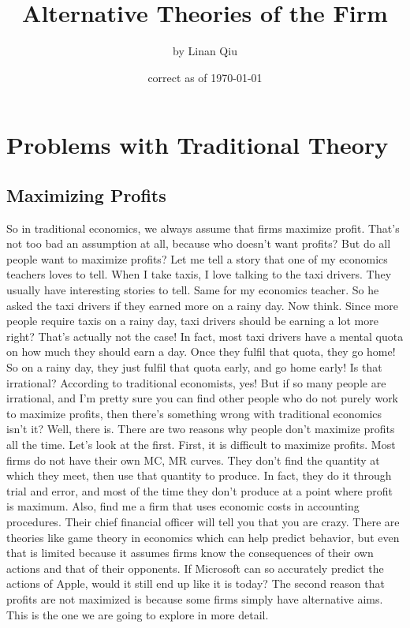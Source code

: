 \RequirePackage{../../dominatrix}

\title{Alternative Theories of the Firm}
\author{\large by Linan Qiu}
\date{\small correct as of \today}

\maketitle
\tableofcontents
\section{Problems with Traditional Theory}
\subsection{Maximizing Profits}
So in traditional economics, we always assume that firms maximize profit. That's not too bad an assumption at all, because who doesn't want profits? But do all people want to maximize profits? Let me tell a story that one of my economics teachers loves to tell. When I take taxis, I love talking to the taxi drivers. They usually have interesting stories to tell. Same for my economics teacher. So he asked the taxi drivers if they earned more on a rainy day. Now think. Since more people require taxis on a rainy day, taxi drivers should be earning a lot more right? That's actually not the case! In fact, most taxi drivers have a mental quota on how much they should earn a day. Once they fulfil that quota, they go home! So on a rainy day, they just fulfil that quota early, and go home early! Is that irrational? According to traditional economists, yes! But if so many people are irrational, and I'm pretty sure you can find other people who do not purely work to maximize profits, then there's something wrong with traditional economics isn't it? Well, there is. There are two reasons why people don't maximize profits all the time. Let's look at the first. First, it is difficult to maximize profits. Most firms do not have their own MC, MR curves. They don't find the quantity at which they meet, then use that quantity to produce. In fact, they do it through trial and error, and most of the time they don't produce at a point where profit is maximum. Also, find me a firm that uses economic costs in accounting procedures. Their chief financial officer will tell you that you are crazy. There are theories like game theory in economics which can help predict behavior, but even that is limited because it assumes firms know the consequences of their own actions and that of their opponents. If Microsoft can so accurately predict the actions of Apple, would it still end up like it is today? The second reason that profits are not maximized is because some firms simply have alternative aims. This is the one we are going to explore in more detail.
